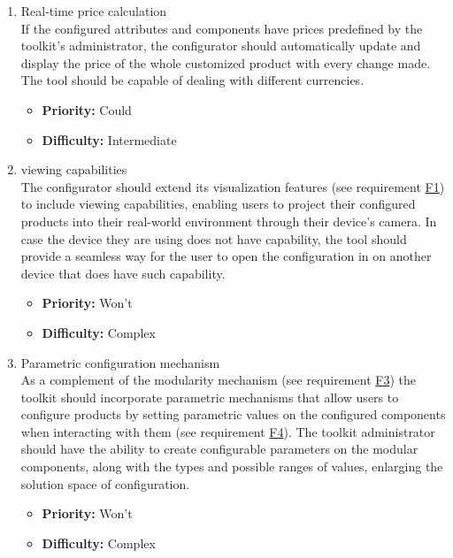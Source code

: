 \begin{enumerate}[label=\textbf{F\arabic*:}, leftmargin=30pt]
\item \label{itm:F18} Real-time price calculation
\vspace{2pt}
\\If the configured attributes and components have prices predefined by the toolkit's administrator, the configurator should automatically update and display the price of the whole customized product with every change made. The tool should be capable of dealing with different currencies.
\begin{itemize}[noitemsep, label=\trianglebullet]
    \item \textbf{Priority:} Could
    \item \textbf{Difficulty:} Intermediate
\end{itemize}
\vspace{4pt}

\item \label{itm:F19}  viewing capabilities
\vspace{2pt}
\\The configurator should extend its visualization features (see requirement \hyperref[itm:F1]{F1}) to include  viewing capabilities, enabling users to project their configured products into their real-world environment through their device's camera. In case the device they are using does not have  capability, the tool should provide a seamless way for the user to open \newpage the configuration in  on another device that does have such capability.
\begin{itemize}[noitemsep, label=\trianglebullet]
    \item \textbf{Priority:} Won't
    \item \textbf{Difficulty:} Complex
\end{itemize}
\vspace{4pt}

\item \label{itm:F20} Parametric configuration mechanism
\vspace{2pt}
\\As a complement of the modularity mechanism (see requirement \hyperref[itm:F3]{F3}) the toolkit should incorporate parametric mechanisms that allow users to configure products by setting parametric values on the configured components when interacting with them (see requirement \hyperref[itm:F4]{F4}). The toolkit administrator should have the ability to create configurable parameters on the modular components, along with the types and possible ranges of values, enlarging the solution space of configuration.
\begin{itemize}[noitemsep, label=\trianglebullet]
    \item \textbf{Priority:} Won't
    \item \textbf{Difficulty:} Complex
\end{itemize}
\vspace{4pt}


\end{enumerate}
